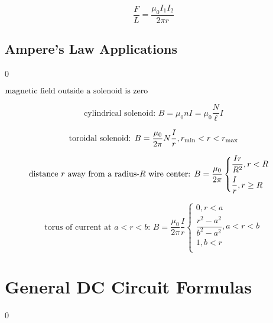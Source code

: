 \documentclass[12pt]{article}
\newcommand \vpx [1]{\vspace{#1px}}
\begin{document}
\begin{equation}
	\dfrac F L = \dfrac {\mu_0 I_1 I_2} {2 \pi r}
\end{equation}

\newpage

\subsection{Ampere's Law Applications} \setcounter {equation} 0

$\hfill \text{magnetic field outside a solenoid is zero} \hfill$

\begin{equation}
	\text{cylindrical solenoid: } B = \mu_0 n I = \mu_0 \dfrac N \ell I
\end{equation}

\begin{equation}
	\text{toroidal solenoid: } B = \dfrac{\mu_0}{2 \pi} N \dfrac I r, r_{\rm min} < r < r_{\rm max}
\end{equation}

\begin{equation}
	\text{distance $r$ away from a radius-$R$ wire center: } B = \dfrac{\mu_0}{2 \pi} \begin{cases}
		\vpx 5
		\dfrac {I r} {R^2}, r < R \\
		\dfrac I r, r \ge R
	\end{cases}
\end{equation}

\begin{equation}
	\text{torus of current at $a < r < b$: } B = \dfrac {\mu_0} {2 \pi} \dfrac I r \begin{cases}
		0, r < a \\
		\dfrac {r^2 - a^2} {b^2 - a^2}, a < r < b \\
		1, b < r \\
	\end{cases}
\end{equation}

\newpage

\section{General DC Circuit Formulas} \setcounter {equation} 0
\end{document}
